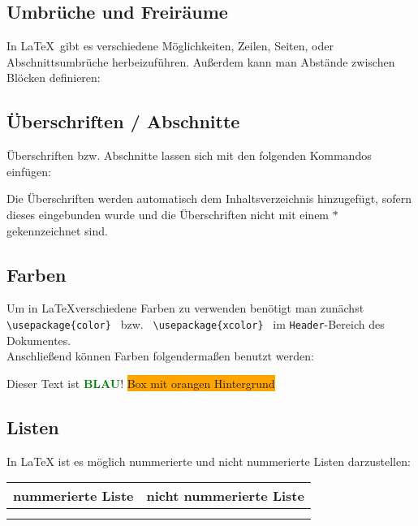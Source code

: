 \subsection{Umbrüche und Freiräume}
In \LaTeX \ gibt es verschiedene Möglichkeiten, Zeilen, Seiten, oder 
Abschnittsumbrüche herbeizuführen. Außerdem kann man Abstände zwischen Blöcken 
definieren:


\subsection{Überschriften / Abschnitte}
Überschriften bzw. Abschnitte lassen sich mit den folgenden Kommandos einfügen:

Die Überschriften werden automatisch dem Inhaltsverzeichnis hinzugefügt, sofern 
dieses eingebunden wurde und die Überschriften nicht mit einem $*$ 
gekennzeichnet sind.
\subsection{Farben}

Um in \LaTeX verschiedene Farben zu verwenden benötigt man zunächst
\lstinline$ \usepackage{color} $ bzw. \lstinline$ \usepackage{xcolor} $ im 
\texttt{Header}-Bereich des Dokumentes.
\\
Anschließend können Farben folgendermaßen benutzt werden:
\begin{flushleft}
\pagecolor{white}   %
\color{blue}         %
Dieser Text ist
\textcolor{green}{\textbf{BLAU}}!    %
\colorbox{orange}{Box mit orangen Hintergrund}   %
\color{schrift}
\\
\end{flushleft}



\subsection{Listen}
In LaTeX ist es möglich nummerierte und nicht nummerierte Listen darzustellen:

\begin{tabular}{c|c}
nummerierte Liste & nicht nummerierte Liste \\ 
\hline  &  \\ 
\hline  &  \\ 
\end{tabular} 